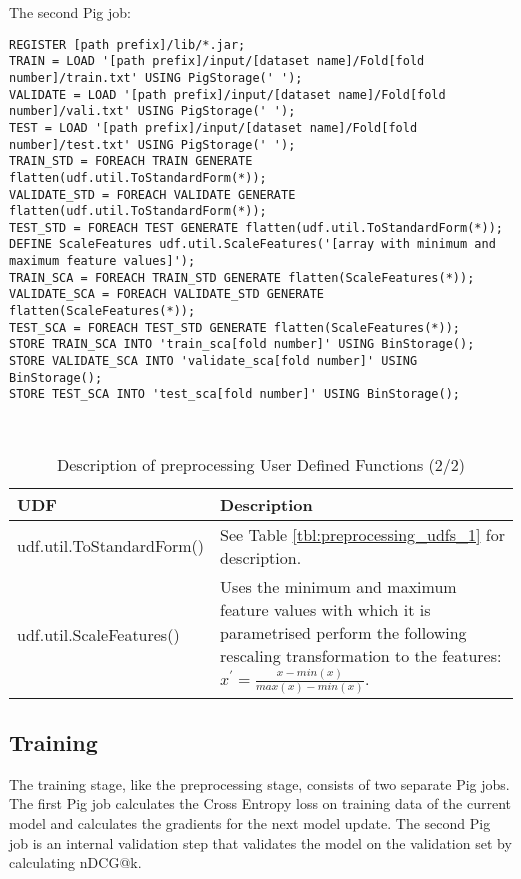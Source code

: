 The second Pig job:\\
\begin{minipage}{\linewidth}
\begin{lstlisting}
REGISTER [path prefix]/lib/*.jar;
TRAIN = LOAD '[path prefix]/input/[dataset name]/Fold[fold number]/train.txt' USING PigStorage(' ');
VALIDATE = LOAD '[path prefix]/input/[dataset name]/Fold[fold number]/vali.txt' USING PigStorage(' ');
TEST = LOAD '[path prefix]/input/[dataset name]/Fold[fold number]/test.txt' USING PigStorage(' ');
TRAIN_STD = FOREACH TRAIN GENERATE flatten(udf.util.ToStandardForm(*));
VALIDATE_STD = FOREACH VALIDATE GENERATE flatten(udf.util.ToStandardForm(*));
TEST_STD = FOREACH TEST GENERATE flatten(udf.util.ToStandardForm(*));
DEFINE ScaleFeatures udf.util.ScaleFeatures('[array with minimum and maximum feature values]');
TRAIN_SCA = FOREACH TRAIN_STD GENERATE flatten(ScaleFeatures(*));
VALIDATE_SCA = FOREACH VALIDATE_STD GENERATE flatten(ScaleFeatures(*));
TEST_SCA = FOREACH TEST_STD GENERATE flatten(ScaleFeatures(*));
STORE TRAIN_SCA INTO 'train_sca[fold number]' USING BinStorage();
STORE VALIDATE_SCA INTO 'validate_sca[fold number]' USING BinStorage();
STORE TEST_SCA INTO 'test_sca[fold number]' USING BinStorage();
\end{lstlisting}
\end{minipage}\\

\begin{table}
\centering
\begin{tabular}{p{5cm}p{8cm}}\toprule
UDF & Description \\
\midrule
udf.util.ToStandardForm() & See Table \ref{tbl:preprocessing_udfs_1} for description.\\
udf.util.ScaleFeatures() & Uses the minimum and maximum feature values with which it is parametrised perform the following rescaling transformation to the features: $x^{'} = \frac{x-min(x)}{max(x)-min(x)}$.\\
\bottomrule
\end{tabular}
\caption{Description of preprocessing User Defined Functions (2/2)}
\label{tbl:preprocessing_udfs_2}
\end{table}

\subsection{Training}
The training stage, like the preprocessing stage, consists of two separate Pig jobs. The first Pig job calculates the Cross Entropy loss on training data of the current model and calculates the gradients for the next model update. The second Pig job is an internal validation step that validates the model on the validation set by calculating \ac{nDCG}@k.\\

